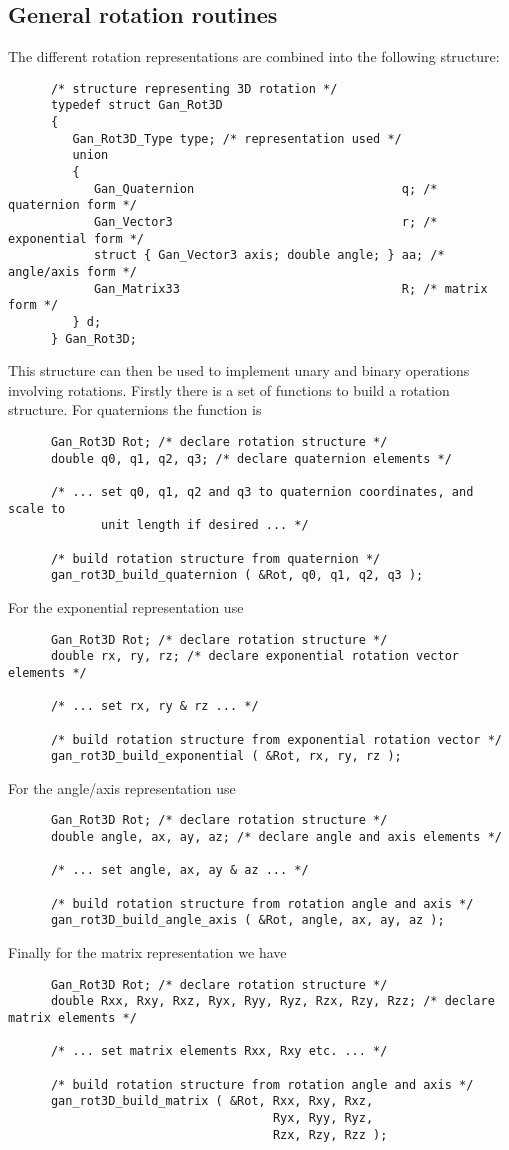 \subsection{General rotation routines}
The different rotation representations are combined into the following
structure:
\begin{verbatim}
      /* structure representing 3D rotation */
      typedef struct Gan_Rot3D
      {
         Gan_Rot3D_Type type; /* representation used */
         union
         {
            Gan_Quaternion                             q; /* quaternion form */
            Gan_Vector3                                r; /* exponential form */
            struct { Gan_Vector3 axis; double angle; } aa; /* angle/axis form */
            Gan_Matrix33                               R; /* matrix form */
         } d;
      } Gan_Rot3D;
\end{verbatim}
This structure can then be used to implement unary and binary operations
involving rotations. Firstly there is a set of functions to build a rotation
structure. For quaternions the function is
\begin{verbatim}
      Gan_Rot3D Rot; /* declare rotation structure */
      double q0, q1, q2, q3; /* declare quaternion elements */

      /* ... set q0, q1, q2 and q3 to quaternion coordinates, and scale to
             unit length if desired ... */

      /* build rotation structure from quaternion */
      gan_rot3D_build_quaternion ( &Rot, q0, q1, q2, q3 );
\end{verbatim}
For the exponential representation use
\begin{verbatim}
      Gan_Rot3D Rot; /* declare rotation structure */
      double rx, ry, rz; /* declare exponential rotation vector elements */

      /* ... set rx, ry & rz ... */

      /* build rotation structure from exponential rotation vector */
      gan_rot3D_build_exponential ( &Rot, rx, ry, rz );
\end{verbatim}
For the angle/axis representation use
\begin{verbatim}
      Gan_Rot3D Rot; /* declare rotation structure */
      double angle, ax, ay, az; /* declare angle and axis elements */

      /* ... set angle, ax, ay & az ... */

      /* build rotation structure from rotation angle and axis */
      gan_rot3D_build_angle_axis ( &Rot, angle, ax, ay, az );
\end{verbatim}
Finally for the matrix representation we have
\begin{verbatim}
      Gan_Rot3D Rot; /* declare rotation structure */
      double Rxx, Rxy, Rxz, Ryx, Ryy, Ryz, Rzx, Rzy, Rzz; /* declare matrix elements */

      /* ... set matrix elements Rxx, Rxy etc. ... */

      /* build rotation structure from rotation angle and axis */
      gan_rot3D_build_matrix ( &Rot, Rxx, Rxy, Rxz,
                                     Ryx, Ryy, Ryz,
                                     Rzx, Rzy, Rzz );
\end{verbatim}

